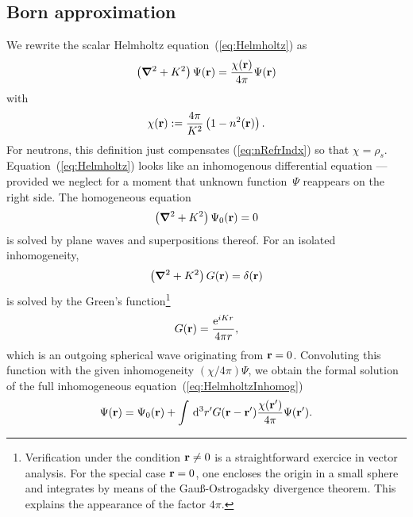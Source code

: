 \subsection{Born approximation}

We rewrite the scalar Helmholtz equation~(\ref{eq:Helmholtz}) as
\begin{equation}\label{eq:HelmholtzInhomog}
  \left(\bm{\nabla}^2+K^2\right)\Psi(\mathbf{r})
  = \frac{\chi(\mathbf{r})}{4\pi}\Psi(\mathbf{r})
\end{equation}
with
\begin{equation}\label{eq:ChiDef}
  \chi(\mathbf{r}) := \frac{4\pi}{K^2}\left(1-n^2(\mathbf{r})\right).
\end{equation}
For neutrons, this definition just compensates (\ref{eq:nRefrIndx})
so that $\chi=\rho_s$.
Equation~(\ref{eq:Helmholtz}) looks
like an inhomogenous differential equation ---
provided we neglect for a moment that unknown function~$\Psi$
reappears on the right side.
The homogeneous equation
\begin{equation}\label{eq:HelmholtzHomog}
  \left(\bm{\nabla}^2+K^2\right)\Psi_0(\mathbf{r}) = 0
\end{equation}
is solved by plane waves and superpositions thereof.
For an isolated inhomogeneity,
\begin{equation}\label{eq:HelmholtzForGreen}
  \left(\bm{\nabla}^2+K^2\right)G(\mathbf{r}) = \delta(\mathbf{r})
\end{equation}
is solved by the Green's function\footnote
{Verification under the condition $\mathbf{r}\ne0$
is a straightforward exercice in vector analysis.
For the special case $\mathbf{r}=0$,
one encloses the origin in a small sphere
and integrates by means of the Gauß-Ostrogadsky divergence theorem.
This explains the appearance of the factor $4\pi$.}
\begin{equation}\label{eq:Greens1}
  G(\mathbf{r}) = \frac{{\rm e}^{iKr}}{4\pi r},
\end{equation}
which is an outgoing spherical wave originating from $\mathbf{r}=0$.
Convoluting this function with the given inhomogeneity $(\chi/4\pi)\Psi$,
we obtain the formal solution
of the full inhomogeneous equation~(\ref{eq:HelmholtzInhomog})
\begin{equation}\label{eq:PsiFormal}
  \Psi(\mathbf{r})
  = \Psi_0(\mathbf{r})
  + \int\,{\rm d}^3r' G(\mathbf{r}-\mathbf{r'})
                     \frac{\chi(\mathbf{r'})}{4\pi}\Psi(\mathbf{r'}).
\end{equation}
